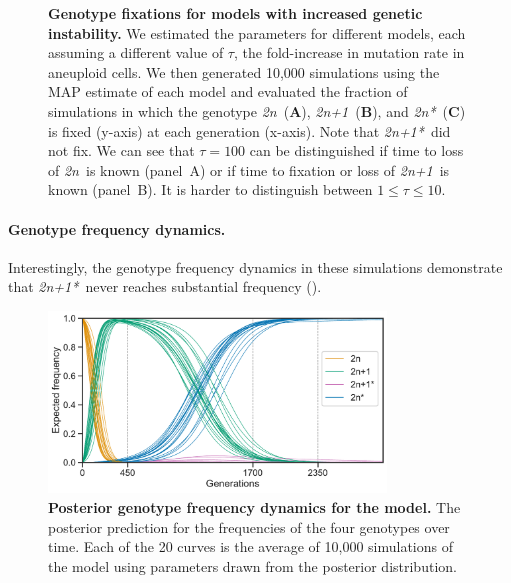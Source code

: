 \documentclass[12pt]{extarticle}
\newcommand{\euwt}{\emph{2n}}
\newcommand{\anwt}{\emph{2n+1}}
\newcommand{\eumt}{\emph{2n*}}
\newcommand{\anmt}{\emph{2n+1*}}
\begin{document}
\begin{figure}[p!]
\begin{subfigure}{0.75\textwidth}
  \end{subfigure}
   \caption{
    \textbf{Genotype fixations for models with increased genetic instability.} We estimated the parameters for different models, each assuming a different value of $\tau$, the fold-increase in mutation rate in aneuploid cells. We then generated 10,000 simulations using the MAP estimate of each model and evaluated the fraction of simulations in which the genotype \euwt\ (\textbf{A}), \anwt\ (\textbf{B}), and \eumt\ (\textbf{C}) is fixed (y-axis) at each generation (x-axis). Note that \anmt\ did not fix. We can see that $\tau=100$ can be distinguished if time to loss of \euwt\ is known (panel~A) or if time to fixation or loss of \anwt\ is known (panel~B). It is harder to distinguish between $1\leq \tau \leq10$.
  }
  \label{fig:tau-plots}
\end{figure}



\paragraph*{Genotype frequency dynamics.}
Interestingly, the genotype frequency dynamics in these simulations demonstrate that \anmt\ never reaches substantial frequency (). %

\begin{figure}[h!]
  \centering
\includegraphics[width=0.8\textwidth]{../figures/dynamics.pdf}
  \caption{
  \textbf{Posterior genotype frequency dynamics for the model.} 
  The posterior prediction for the frequencies of the four genotypes over time. Each of the 20 curves is the average of 10,000 simulations of the model using parameters drawn from the posterior distribution.
  }
  \label{fig:ppc-plot}
\end{figure}
\end{document}
